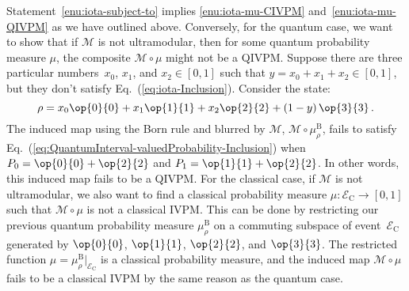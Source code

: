 \documentclass[english,reprint, aps, prl,superscriptaddress, showpacs,
showkeys, longbibliography, amsmath, amssymb, floatfix]{revtex4-1}
\theoremstyle{plain}
\theoremstyle{definition}
\newcommand{\events}{\ensuremath{\mathcal{E}}}
\newcommand{\proj}[1]{\op{#1}{#1}}
\newcommand{\ultramodular}{\mathcal{M}}
\begin{document}
Statement~\ref{enu:iota-subject-to} implies \ref{enu:iota-mu-CIVPM}
and~\ref{enu:iota-mu-QIVPM} as we have outlined above. Conversely, for the quantum case, we want
to show that if $\ultramodular$ is not ultramodular, then for
some quantum probability measure $\mu$, the composite
$\ultramodular\circ\mu$ might not be a QIVPM. Suppose there are three
particular numbers~$x_{0}$, $x_{1}$, and $x_{2}\in\left[0,1\right]$
such that $y=x_{0}+x_{1}+x_{2}\in\left[0,1\right]$, but they don't
satisfy Eq.~(\ref{eq:iota-Inclusion}). Consider the state:
\[
\rho=x_{0}\proj{0}+x_{1}\proj{1}+x_{2}\proj{2}+\left(1-y\right)\proj{3}\,.
\]
The induced map using the Born rule and blurred by $\ultramodular$,
$\ultramodular\circ\mu_{\rho}^{\mathrm{\mathrm{B}}}$, fails to satisfy
Eq.~(\ref{eq:QuantumInterval-valuedProbability-Inclusion}) when
$P_{0}=\proj{0}+\proj{2}$ and $P_{1}=\proj{1}+\proj{2}$. In other
words, this induced map fails to be a QIVPM. For the classical case, if
$\ultramodular$ is not ultramodular, we also want to find a classical
probability measure $\mu:\events_{\mathrm{C}}\rightarrow\left[0,1\right]$ such
that $\ultramodular\circ\mu$ is not a classical IVPM. This can be
done by restricting our previous quantum probability measure
$\mu_{\rho}^{\mathrm{\mathrm{B}}}$ on a commuting subspace of
event~$\events_{\mathrm{C}}$ generated by $\proj{0}$, $\proj{1}$, $\proj{2}$,
and $\proj{3}$. The restricted function
$\mu=\mu_{\rho}^{\mathrm{\mathrm{B}}}|_{\events_{\mathrm{C}}}$ is a classical probability
measure, and the induced map $\ultramodular\circ\mu$ fails to be
a classical IVPM by the same reason as the quantum case.

\end{document}
